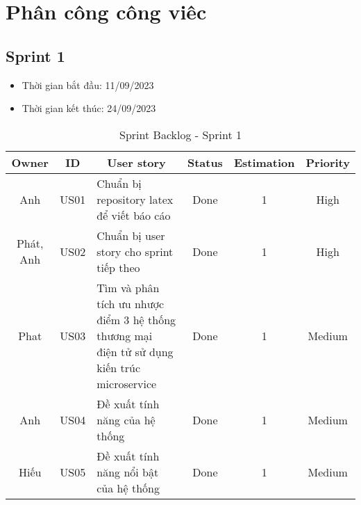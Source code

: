 \chapter{Phân công công viêc}
\section{Sprint 1}
\begin{itemize}
    \item Thời gian bắt đầu: 11/09/2023
    \item Thời gian kết thúc: 24/09/2023
\end{itemize}
\begin{table}[H]
    \begin{tabular}{|c|c|m{6cm}|c|c|c|}
    \hline
    \textbf{Owner} & \textbf{ID} & \multicolumn{1}{c|}{\textbf{User story}}                                & \textbf{Status} & \textbf{Estimation} & \textbf{Priority} \\ \hline
    Anh            & US01        & Chuẩn bị repository latex để viết báo cáo                                     & Done            & 1                   & High              \\ \hline
    Phát, Anh      & US02        & Chuẩn bị user story cho sprint tiếp theo                                             & Done            & 1                   & High              \\ \hline
    Phat           & US03        & Tìm và phân tích ưu nhược điểm 3 hệ thống thương mại điện tử sử dụng kiến trúc microservice  & Done            & 1                   & Medium            \\ \hline
    Anh            & US04        & Đề xuất tính năng của hệ thống                               & Done            & 1                   & Medium            \\ \hline
    Hiếu           & US05        & Đề xuất tính năng nổi bật của hệ thống                         & Done            & 1                   & Medium            \\ \hline
    \end{tabular}
    \caption{Sprint Backlog - Sprint 1}
    \label{tab:sprint-1}
\end{table}
